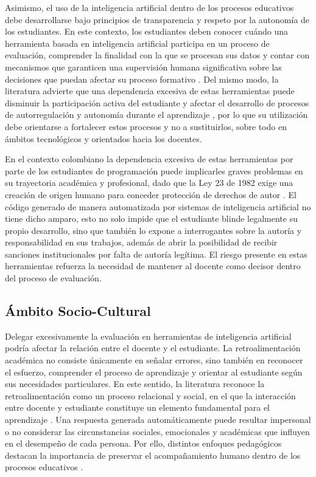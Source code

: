 \documentclass[letterpaper, 10 pt, conference]{ieeeconf}
\begin{document}
Asimismo, el uso de la inteligencia artificial dentro de los procesos educativos debe desarrollarse bajo principios de transparencia y respeto por la autonomía de los estudiantes. En este contexto, los estudiantes deben conocer cuándo una herramienta basada en inteligencia artificial participa en un proceso de evaluación, comprender la finalidad con la que se procesan sus datos y contar con mecanismos que garanticen una supervisión humana significativa sobre las decisiones que puedan afectar su proceso formativo \cite{14}. Del mismo modo, la literatura advierte que una dependencia excesiva de estas herramientas puede disminuir la participación activa del estudiante y afectar el desarrollo de procesos de autorregulación y autonomía durante el aprendizaje \cite{15}, por lo que su utilización debe orientarse a fortalecer estos procesos y no a sustituirlos, sobre todo en ámbitos tecnológicos y orientados hacia los docentes.

En el contexto colombiano la dependencia excesiva de estas herramientas por parte de los estudiantes de programación puede implicarles graves problemas en su trayectoria académica y profesional, dado que la Ley 23 de 1982 exige una creación de origen humano para conceder protección de derechos de autor \cite{20}. El código generado de manera automatizada por sistemas de inteligencia artificial no tiene dicho amparo, esto no solo impide que el estudiante blinde legalmente su propio desarrollo, sino que también lo expone a interrogantes sobre la autoría y responsabilidad en sus trabajos, además de abrir la posibilidad de recibir sanciones institucionales por falta de autoría legítima. El riesgo presente en estas herramientas refuerza la necesidad de mantener al docente como decisor dentro del proceso de evaluación.


\subsection{Ámbito Socio-Cultural} 

Delegar excesivamente la evaluación en herramientas de inteligencia artificial podría afectar la relación entre el docente y el estudiante. La retroalimentación académica no consiste únicamente en señalar errores, sino también en reconocer el esfuerzo, comprender el proceso de aprendizaje y orientar al estudiante según sus necesidades particulares. En este sentido, la literatura reconoce la retroalimentación como un proceso relacional y social, en el que la interacción entre docente y estudiante constituye un elemento fundamental para el aprendizaje \cite{5}. Una respuesta generada automáticamente puede resultar impersonal o no considerar las circunstancias sociales, emocionales y académicas que influyen en el desempeño de cada persona. Por ello, distintos enfoques pedagógicos destacan la importancia de preservar el acompañamiento humano dentro de los procesos educativos \cite{14}. 
\end{document}
